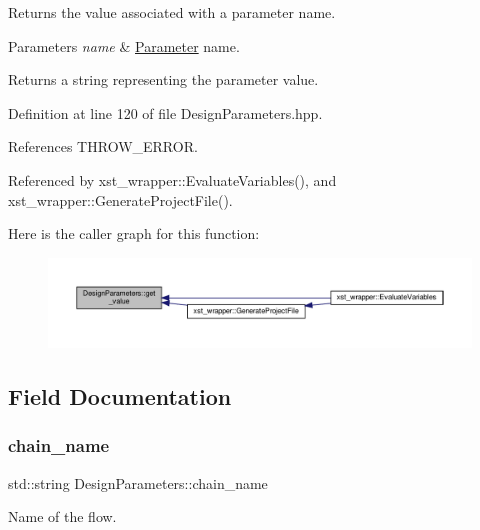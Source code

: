 Returns the value associated with a parameter name. 


\begin{DoxyParams}{Parameters}
{\em name} & \hyperlink{classParameter}{Parameter} name. \\
\hline
\end{DoxyParams}
\begin{DoxyReturn}{Returns}
a string representing the parameter value. 
\end{DoxyReturn}


Definition at line 120 of file Design\+Parameters.\+hpp.



References T\+H\+R\+O\+W\+\_\+\+E\+R\+R\+OR.



Referenced by xst\+\_\+wrapper\+::\+Evaluate\+Variables(), and xst\+\_\+wrapper\+::\+Generate\+Project\+File().

Here is the caller graph for this function\+:
\nopagebreak
\begin{figure}[H]
\begin{center}
\leavevmode
\includegraphics[width=350pt]{d7/d62/structDesignParameters_a806361f8a2596f9f6dea7f73155dd871_icgraph}
\end{center}
\end{figure}


\subsection{Field Documentation}
\mbox{\label{structDesignParameters_af062927befa30ce5d47ef81cdb1ac607}} 
\subsubsection{\texorpdfstring{chain\+\_\+name}{chain\_name}}
{\footnotesize\ttfamily std\+::string Design\+Parameters\+::chain\+\_\+name}



Name of the flow. 



